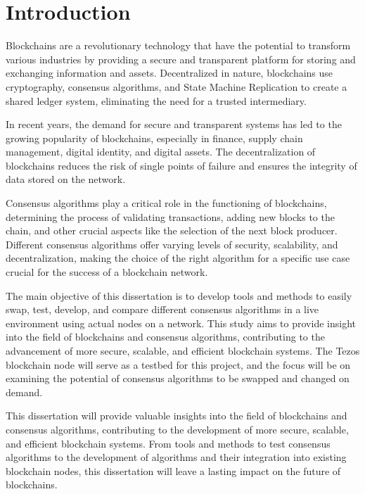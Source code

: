 \chapter{Introduction}
\label{chap:int}


Blockchains are a revolutionary technology that have the potential to transform various industries by providing a secure and transparent platform for storing and exchanging information and assets. Decentralized in nature, blockchains use cryptography, consensus algorithms, and State Machine Replication to create a shared ledger system, eliminating the need for a trusted intermediary.

In recent years, the demand for secure and transparent systems has led to the growing popularity of blockchains, especially in finance, supply chain management, digital identity, and digital assets. The decentralization of blockchains reduces the risk of single points of failure and ensures the integrity of data stored on the network.

Consensus algorithms play a critical role in the functioning of blockchains, determining the process of validating transactions, adding new blocks to the chain, and other crucial aspects like the selection of the next block producer. Different consensus algorithms offer varying levels of security, scalability, and decentralization, making the choice of the right algorithm for a specific use case crucial for the success of a blockchain network.


The main objective of this dissertation is to develop tools and methods to easily swap, test, develop, and compare different consensus algorithms in a live environment using actual nodes on a network. This study aims to provide insight into the field of blockchains and consensus algorithms, contributing to the advancement of more secure, scalable, and efficient blockchain systems. The Tezos \cite{goodman2014tezos} blockchain node will serve as a testbed for this project, and the focus will be on examining the potential of consensus algorithms to be swapped and changed on demand.

This dissertation will provide valuable insights into the field of blockchains and consensus algorithms, contributing to the development of more secure, scalable, and efficient blockchain systems. From tools and methods to test consensus algorithms to the development of algorithms and their integration into existing blockchain nodes, this dissertation will leave a lasting impact on the future of blockchains.

